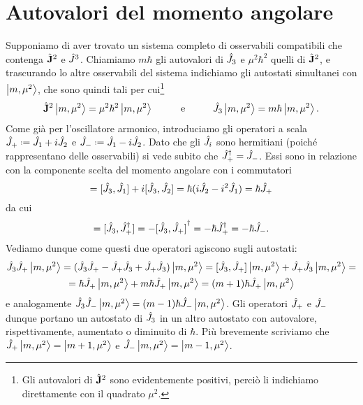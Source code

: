\section{Autovalori del momento angolare} \label{sec:autovalori-momento-angolare}
Supponiamo di aver trovato un sistema completo di osservabili compatibili che contenga $\hat{\mathbf{J}}^2$ e $\hat{J}^3$.
Chiamiamo $m\hbar$ gli autovalori di $\hat{J}_3$ e $\mu^2\hbar^2$ quelli di $\hat{\mathbf{J}}^2$, e trascurando lo altre osservabili del sistema indichiamo gli autostati simultanei con $\left|{m,\mu^2}\right\rangle$, che sono quindi tali per cui\footnote{Gli autovalori di $\hat{\mathbf{J}}^2$ sono evidentemente positivi, perciò li indichiamo direttamente con il quadrato $\mu^2$.}
\begin{equation}
	\hat{\mathbf{J}}^2\left|{m,\mu^2}\right\rangle=\mu^2\hbar^2\left|{m,\mu^2}\right\rangle
	\hspace{1cm}\text{e}\hspace{1cm}
	\hat{J}_3\left|{m,\mu^2}\right\rangle=m\hbar\left|{m,\mu^2}\right\rangle.
\end{equation}
Come già per l'oscillatore armonico, introduciamo gli operatori a scala $\op J_+\defeq\op J_1+i\op J_2$ e $\op J_-\defeq\op J_1-i\op J_2$.
Dato che gli $\hat{J}_i$ sono hermitiani (poich\'e rappresentano delle osservabili) si vede subito che ${\hat{J}_+}^\dagger=\hat{J}_-$.
Essi sono in relazione con la componente scelta del momento angolare con i commutatori
\begin{equation}
	[\op J_3,\op J_+]=[\op J_3,\op J_1]+i[\op J_3,\op J_2]=\hbar(i\op J_2-i^2\op J_1)=\hbar\op J_+
\end{equation}
da cui
\begin{equation}
	[\op J_3,\op J_-]=[\op J_3,\adj{\op J_+}]=-\adj{[\op J_3,\op J_+]}=-\hbar\adj{\op J_+}=-\hbar\op J_-.
\end{equation}
Vediamo dunque come questi due operatori agiscono sugli autostati:
\begin{multline}
	\hat{J}_3\hat{J}_+\left|{m,\mu^2}\right\rangle=
	(\hat{J}_3\hat{J}_+ - \hat{J}_+\hat{J}_3 + \hat{J}_+\hat{J}_3)\left|{m,\mu^2}\right\rangle=
	[\hat{J}_3,\hat{J}_+]\left|{m,\mu^2}\right\rangle+\hat{J}_+\hat{J}_3\left|{m,\mu^2}\right\rangle=\\=
	\hbar\hat{J}_+\left|{m,\mu^2}\right\rangle+m\hbar\hat{J}_+\left|{m,\mu^2}\right\rangle=
	(m+1)\hbar\hat{J}_+\left|{m,\mu^2}\right\rangle
\end{multline}
e analogamente $\hat{J}_3\hat{J}_-\left|{m,\mu^2}\right\rangle=(m-1)\hbar\hat{J}_-\left|{m,\mu^2}\right\rangle$.
Gli operatori $\hat{J}_+$ e $\hat{J}_-$ dunque portano un autostato di $\hat{J}_3$ in un altro autostato con autovalore, rispettivamente, aumentato o diminuito di $\hbar$.
Più brevemente scriviamo che $\hat{J}_+\left|{m,\mu^2}\right\rangle=\left|{m+1,\mu^2}\right\rangle$ e $\hat{J}_-\left|{m,\mu^2}\right\rangle=\left|{m-1,\mu^2}\right\rangle$.

